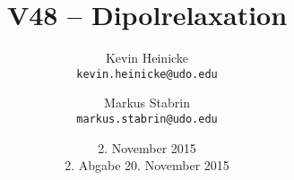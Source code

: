 



\title{%
    V48 -- Dipolrelaxation
}
\author{%
    Kevin Heinicke\\
    \texttt{kevin.heinicke@udo.edu}
    \and
    Markus Stabrin\\
    \texttt{markus.stabrin@udo.edu}
}
\date{%
    2. November 2015\\
    {\small 2. Abgabe} 20. November 2015\\
}

    \maketitle%
    \tableofcontents
    \newpage
    
    

    \printbibliography

